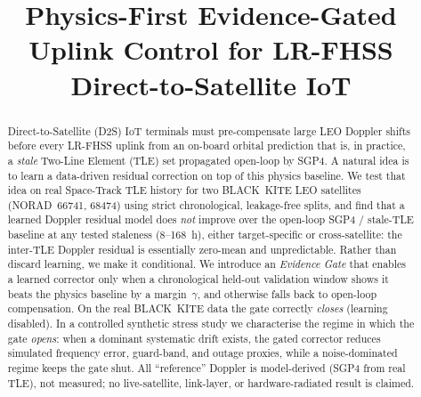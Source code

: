 \documentclass[conference]{IEEEtran}
\begin{document}
\title{Physics-First Evidence-Gated Uplink Control for LR-FHSS Direct-to-Satellite IoT}

\author{
  \and
  \and
}

\maketitle

\begin{abstract}
Direct-to-Satellite (D2S) IoT terminals must pre-compensate large LEO Doppler
shifts before every LR-FHSS uplink from an on-board orbital prediction that is,
in practice, a \emph{stale} Two-Line Element (TLE) set propagated open-loop by
SGP4. A natural idea is to learn a data-driven residual correction on top of this
physics baseline. We test that idea on real Space-Track TLE history for two
BLACK~KITE LEO satellites (NORAD~66741, 68474) using strict chronological,
leakage-free splits, and find that a learned Doppler residual model does
\emph{not} improve over the open-loop SGP4 / stale-TLE baseline at any tested
staleness (8--168~h), either target-specific or cross-satellite: the inter-TLE
Doppler residual is essentially zero-mean and unpredictable. Rather than discard
learning, we make it conditional. We introduce an \emph{Evidence Gate} that
enables a learned corrector only when a chronological held-out validation window
shows it beats the physics baseline by a margin~$\gamma$, and otherwise falls
back to open-loop compensation. On the real BLACK~KITE data the gate correctly
\emph{closes} (learning disabled). In a controlled synthetic stress study we
characterise the regime in which the gate \emph{opens}: when a dominant
systematic drift exists, the gated corrector reduces simulated frequency error,
guard-band, and outage proxies, while a noise-dominated regime keeps the gate
shut. All ``reference'' Doppler is model-derived (SGP4 from real TLE), not
measured; no live-satellite, link-layer, or hardware-radiated result is claimed.
\end{abstract}
\end{document}
